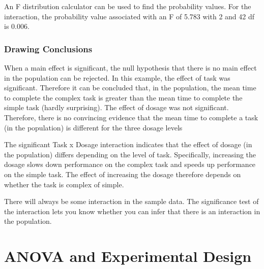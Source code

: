 An F distribution calculator can be used to find the probability values. For the interaction, the probability value associated with an F of 5.783 with 2 and 42 df is 0.006.

\subsection{Drawing Conclusions}

When a main effect is significant, the null hypothesis that there is no main effect in the population can be rejected. In this example, the effect of task was significant. Therefore it can be concluded that, in the population, the mean time to complete the complex task is greater than the mean time to complete the simple task (hardly surprising). The effect of dosage was not significant. Therefore, there is no convincing evidence that the mean time to complete a task (in the population) is different for the three dosage levels

The significant Task x Dosage interaction indicates that the effect of dosage (in the population) differs depending on the level of task. Specifically, increasing the dosage slows down performance on the complex task and speeds up performance on the simple task. The effect of increasing the dosage therefore depends on whether the task is complex of simple.

There will always be some interaction in the sample data. The significance test of the interaction lets you know whether you can infer that there is an interaction in the population.


\chapter{ANOVA and Experimental Design }

